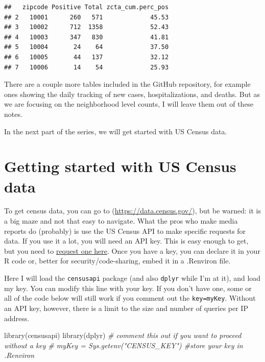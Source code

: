 \documentclass[
  openany]{book}
\newenvironment{Shaded}{\begin{snugshade}}{\end{snugshade}}
\newcommand{\CommentTok}[1]{\textcolor[rgb]{0.56,0.35,0.01}{\textit{#1}}}
\newcommand{\FunctionTok}[1]{\textcolor[rgb]{0.00,0.00,0.00}{#1}}
\newcommand{\NormalTok}[1]{#1}
\begin{document}
\begin{verbatim}
##   zipcode Positive Total zcta_cum.perc_pos
## 2   10001      260   571             45.53
## 3   10002      712  1358             52.43
## 4   10003      347   830             41.81
## 5   10004       24    64             37.50
## 6   10005       44   137             32.12
## 7   10006       14    54             25.93
\end{verbatim}

There are a couple more tables included in the GitHub repository, for example ones showing the daily tracking of new cases, hospitalizations, and deaths. But as we are focusing on the neighborhood level counts, I will leave them out of these notes.

In the next part of the series, we will get started with US Census data.

\hypertarget{part2}{%
\section{Getting started with US Census data}\label{part2}}

To get census data, you can go to (\url{https://data.census.gov/}), but be warned: it is a big maze and not that easy to navigate. What the pros who make media reports do (probably) is use the US Census API to make specific requests for data. If you use it a lot, you will need an API key. This is easy enough to get, but you need to \href{https://api.census.gov/data/key_signup.html}{request one here}. Once you have a key, you can declare it in your R code or, better for security/code-sharing, embed it in a .Renviron file.

Here I will load the \texttt{censusapi} package (and also \texttt{dplyr} while I'm at it), and load my key. You can modify this line with your key. If you don't have one, some or all of the code below will still work if you comment out the \texttt{key=myKey}. Without an API key, however, there is a limit to the size and number of queries per IP address.

\begin{Shaded}
\begin{Highlighting}[]
\FunctionTok{library}\NormalTok{(censusapi)}
\FunctionTok{library}\NormalTok{(dplyr)}
\CommentTok{\# comment this out if you want to proceed without a key}
\CommentTok{\# myKey = Sys.getenv("CENSUS\_KEY") \#store your key in .Renviron}
\end{Highlighting}
\end{Shaded}
\end{document}
